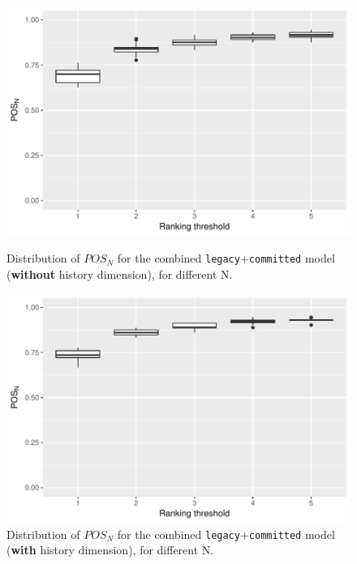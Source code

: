 \begin{figure}[t]
  \centering
  \begin{minipage}[b]{\columnwidth}
    \centering
    \includegraphics[scale=.6]{plots/RQ3_curr}
    \caption{Distribution of $POS_N$ for the combined \texttt{legacy}+\texttt{committed} model (\textbf{without} history dimension), for different N.}
    \label{fig:rq3_curr}
  \end{minipage}
  \begin{minipage}[b]{\columnwidth}
    \centering
    \includegraphics[scale=.6]{plots/RQ3_hist}
    \caption{Distribution of $POS_N$ for the combined \texttt{legacy}+\texttt{committed} model (\textbf{with} history dimension), for different N.}
    \label{fig:rq3_hist}
  \end{minipage}
\end{figure}

